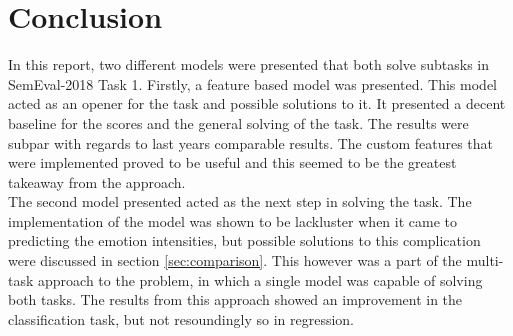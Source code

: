 
\section{Conclusion}
In this report, two different models were presented that both solve subtasks in SemEval-2018 Task 1. Firstly, a feature based model was presented. This model acted as an opener for the task and possible solutions to it. It presented a decent baseline for the scores and the general solving of the task. The results were subpar with regards to last years comparable results. The custom features that were implemented proved to be useful and this seemed to be the greatest takeaway from the approach.\\
The second model presented acted as the next step in solving the task. The implementation of the model was shown to be lackluster when it came to predicting the emotion intensities, but possible solutions to this complication were discussed in section \ref{sec:comparison}. This however was a part of the multi-task approach to the problem, in which a single model was capable of solving both tasks. The results from this approach showed an improvement in the classification task, but not resoundingly so in regression. 